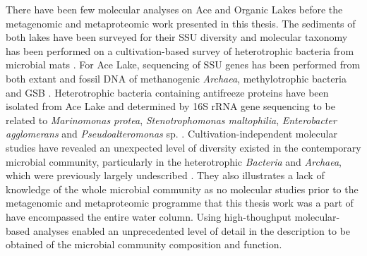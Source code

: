 There have been few molecular analyses on Ace and Organic Lakes before the metagenomic and metaproteomic work presented in this thesis.
The sediments of both lakes have been surveyed for their \ac{SSU} diversity \cite{Bowman2000a, Bowman2000b} and molecular taxonomy has been performed on a cultivation-based survey of heterotrophic bacteria from microbial mats \cite{VanTrappen2002}.
For Ace Lake, sequencing of \ac{SSU} genes has been performed from both extant and fossil DNA of methanogenic \emph{Archaea}, methylotrophic bacteria and \ac{GSB} \cite{Coolen2004a, Coolen2004b, Coolen2006, Coolen2008}.
Heterotrophic bacteria containing antifreeze proteins have been isolated from Ace Lake and determined by 16S \ac{rRNA} gene sequencing to be related to \emph{Marinomonas protea}, \emph{Stenotrophomonas maltophilia}, \emph{Enterobacter agglomerans} and \emph{Pseudoalteromonas} sp. \cite{Gilbert2004}.
Cultivation-independent  molecular studies have revealed an unexpected level of diversity existed in the contemporary microbial community, particularly in the heterotrophic \emph{Bacteria} and \emph{Archaea}, which were previously largely undescribed \cite{Bowman2000a, Bowman2000b, Coolen2004a, Coolen2004b, Coolen2006}.
They also illustrates a lack of knowledge of the whole microbial community as no molecular studies prior to the metagenomic and metaproteomic programme that this thesis work was a part of \cite{Ng2010a, Lauro2011} have encompassed the entire water column.
Using high-thoughput molecular-based analyses enabled an unprecedented level of detail in the description to be obtained of the microbial community composition and function.
